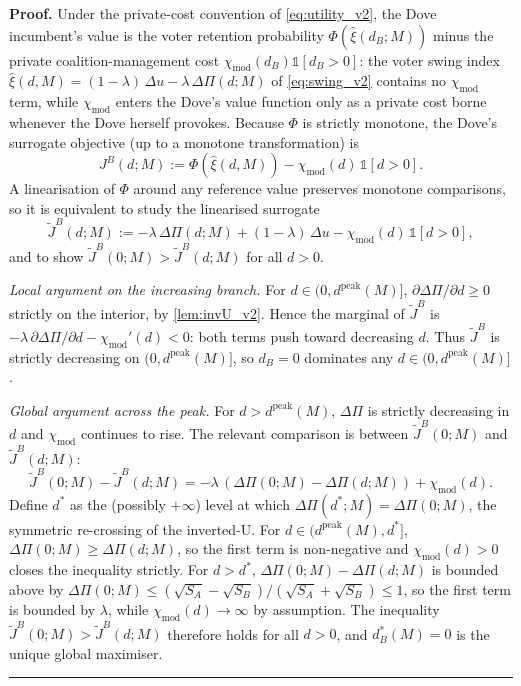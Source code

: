 \documentclass[11pt,twoside]{extarticle}
\newenvironment{proof}[1][Proof]{\noindent \textbf{#1.} }{\ \rule{0.5em}{0.5em}}
\begin{document}
\begin{proof}
Under the private-cost convention of \autoref{eq:utility_v2}, the Dove
incumbent's value is the voter retention probability $\Phi(\hat\xi(d_B;M))$
minus the private coalition-management cost $\chi_{\mathrm{mod}}(d_B)\mathbb{1}[d_B>0]$:
the voter swing index $\hat\xi(d,M)=(1-\lambda)\,\Delta u-\lambda\,\Delta\Pi(d;M)$
of \autoref{eq:swing_v2} contains no $\chi_{\mathrm{mod}}$ term, while
$\chi_{\mathrm{mod}}$ enters the Dove's value function only as a private cost
borne whenever the Dove herself provokes. Because $\Phi$ is strictly
monotone, the Dove's surrogate objective (up to a monotone
transformation) is
\[
J^B(d; M) := \Phi(\hat\xi(d,M)) - \chi_{\mathrm{mod}}(d)\,\mathbb{1}[d > 0].
\]
A linearisation of $\Phi$ around any reference value preserves monotone
comparisons, so it is equivalent to study the linearised surrogate
\[
\tilde J^B(d; M) := -\lambda\,\Delta\Pi(d; M) + (1-\lambda)\,\Delta u - \chi_{\mathrm{mod}}(d)\,\mathbb{1}[d>0],
\]
and to show $\tilde J^B(0; M) > \tilde J^B(d; M)$ for all $d > 0$.

\textit{Local argument on the increasing branch.} For
$d \in (0, d^{\mathrm{peak}}(M)]$, $\partial\Delta\Pi/\partial d \ge 0$
strictly on the interior, by \autoref{lem:invU_v2}. Hence the marginal
of $\tilde J^B$ is $-\lambda\,\partial\Delta\Pi/\partial d - \chi_{\mathrm{mod}}'(d) < 0$:
both terms push toward decreasing $d$. Thus $\tilde J^B$ is strictly
decreasing on $(0, d^{\mathrm{peak}}(M)]$, so $d_B = 0$ dominates any
$d \in (0, d^{\mathrm{peak}}(M)]$.

\textit{Global argument across the peak.} For $d > d^{\mathrm{peak}}(M)$,
$\Delta\Pi$ is strictly decreasing in $d$ and $\chi_{\mathrm{mod}}$
continues to rise. The relevant comparison is between $\tilde J^B(0; M)$
and $\tilde J^B(d; M)$:
\[
\tilde J^B(0; M) - \tilde J^B(d; M) = -\lambda\,(\Delta\Pi(0; M) - \Delta\Pi(d; M)) + \chi_{\mathrm{mod}}(d).
\]
Define $d^*$ as the (possibly $+\infty$) level at which $\Delta\Pi(d^*;M)=\Delta\Pi(0;M)$, the symmetric
re-crossing of the inverted-U. For $d \in (d^{\mathrm{peak}}(M), d^*]$,
$\Delta\Pi(0;M) \ge \Delta\Pi(d;M)$, so the first term is non-negative
and $\chi_{\mathrm{mod}}(d) > 0$ closes the inequality strictly. For
$d > d^*$, $\Delta\Pi(0;M)-\Delta\Pi(d;M)$ is bounded above by
$\Delta\Pi(0;M) \le (\sqrt{S_A}-\sqrt{S_B})/(\sqrt{S_A}+\sqrt{S_B})\le 1$, so the first term
is bounded by $\lambda$, while $\chi_{\mathrm{mod}}(d) \to \infty$ by
assumption. The inequality $\tilde J^B(0; M) > \tilde J^B(d; M)$
therefore holds for all $d > 0$, and $d_B^*(M) = 0$ is the unique
global maximiser.
\end{proof}
\end{document}
